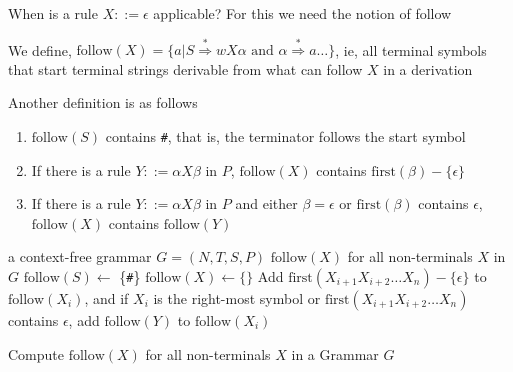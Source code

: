 \documentclass[8pt,a4paper,compress]{beamer}
\newcommand{\derives}{\stackrel{*}{\Rightarrow}}
\begin{document}
\begin{frame}[fragile]
\pause

When is a rule $X ::= \epsilon$ applicable?  For this we need the notion of follow

\pause
\bigskip

We define, $\text{follow}(X) = \{a | S \derives wX\alpha \text{ and } \alpha \derives a \dots\}$, ie, all terminal symbols that start terminal strings derivable from what can follow $X$ in a derivation

\pause
\bigskip

Another definition is as follows
\begin{enumerate}
\item $\text{follow}(S)$ contains \lstinline{#}, that is, the terminator follows the start symbol
\item If there is a rule $Y ::= \alpha X \beta$ in $P$, $\text{follow}(X)$ contains $\text{first}(\beta) - \{\epsilon\}$
\item If there is a rule $Y ::= \alpha X \beta$ in $P$ and either $\beta = \epsilon$ or $\text{first}(\beta)$ contains $\epsilon$, $\text{follow}(X)$ contains $\text{follow}(Y)$
\end{enumerate}
\end{frame}

\begin{frame}[fragile]
\pause

\begin{algorithm}[H]
\begin{algorithmic}
\REQUIRE a context-free grammar $G = (N,T,S,P)$
\ENSURE  $\text{follow}(X)$ for all non-terminals $X$ in $G$
\STATE $\text{follow}(S) \gets$ \{\lstinline{#}\}
\STATE $\text{follow}(X) \gets \{\}$
\ENDFOR
\REPEAT
{}
\STATE Add $\text{first}(X_{i+1}X_{i+2} \dots X_n) - \{\epsilon\}$ to $\text{follow}(X_i)$, and
if $X_i$ is the right-most symbol or $\text{first}(X_{i+1}X_{i+2} \dots X_n)$ contains $\epsilon$, add $\text{follow}(Y)$ to $\text{follow}(X_i)$
\ENDFOR
\ENDFOR
{}
\end{algorithmic}
\caption{Compute $\text{follow}(X)$ for all non-terminals $X$ in a Grammar $G$}
\end{algorithm}
\end{frame}
\end{document}
